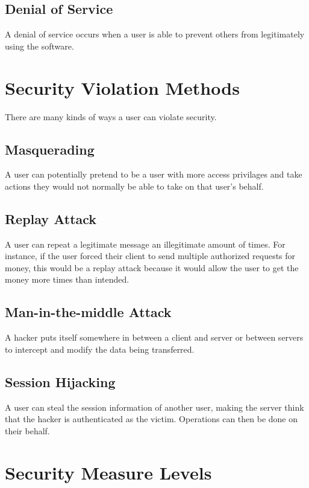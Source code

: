 \documentclass{article}
\begin{document}
\subsection{Denial of Service}

A denial of service occurs when a user is able to prevent others from
legitimately using the software.

\section{Security Violation Methods}

There are many kinds of ways a user can violate security.

\subsection{Masquerading}

A user can potentially pretend to be a user with more access privilages and
take actions they would not normally be able to take on that user's behalf.

\subsection{Replay Attack}

A user can repeat a legitimate message an illegitimate amount of times. For
instance, if the user forced their client to send multiple authorized requests
for money, this would be a replay attack because it would allow the user to get
the money more times than intended.

\subsection{Man-in-the-middle Attack}

A hacker puts itself somewhere in between a client and server or between
servers to intercept and modify the data being transferred.

\subsection{Session Hijacking}

A user can steal the session information of another user, making the server
think that the hacker is authenticated as the victim. Operations can then be
done on their behalf.

\section{Security Measure Levels}
\end{document}
